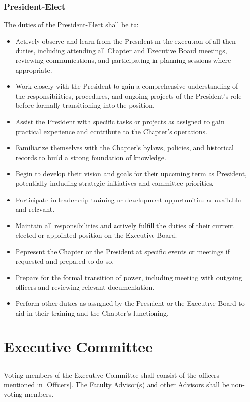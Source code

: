 \documentclass[10pt, oneside]{article}
\begin{document}
\subsubsection{President-Elect}
The duties of the President-Elect shall be to:
\begin{itemize}
    \item Actively observe and learn from the President in the execution of all their duties, including attending all Chapter and Executive Board meetings, reviewing communications, and participating in planning sessions where appropriate.
    \item Work closely with the President to gain a comprehensive understanding of the responsibilities, procedures, and ongoing projects of the President's role before formally transitioning into the position.
    \item Assist the President with specific tasks or projects as assigned to gain practical experience and contribute to the Chapter's operations.
    \item Familiarize themselves with the Chapter's bylaws, policies, and historical records to build a strong foundation of knowledge.
    \item Begin to develop their vision and goals for their upcoming term as President, potentially including strategic initiatives and committee priorities.
    \item Participate in leadership training or development opportunities as available and relevant.
     \item Maintain all responsibilities and actively fulfill the duties of their current elected or appointed position on the Executive Board.
    \item Represent the Chapter or the President at specific events or meetings if requested and prepared to do so.
    \item Prepare for the formal transition of power, including meeting with outgoing officers and reviewing relevant documentation.
    \item Perform other duties as assigned by the President or the Executive Board to aid in their training and the Chapter's functioning.
\end{itemize}

\section{Executive Committee}
\subsection{}
Voting members of the Executive Committee shall consist of the officers mentioned in \ref{Officers}. The Faculty Advisor(s) and other Advisors shall be non-voting members.
\end{document}
